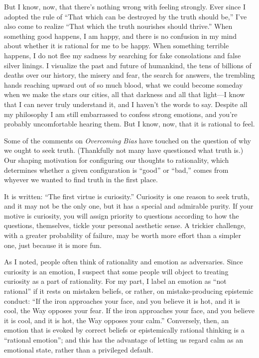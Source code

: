 {
 But I know, now, that there's nothing wrong with
feeling strongly. Ever since I adopted the rule of
``That which can be destroyed by the truth should
be,'' I've also come to realize
``That which the truth nourishes should
thrive.'' When something good happens, I am happy,
and there is no confusion in my mind about whether it is rational for
me to be happy. When something terrible happens, I do not flee my
sadness by searching for fake consolations and false silver linings. I
visualize the past and future of humankind, the tens of billions of
deaths over our history, the misery and fear, the search for answers,
the trembling hands reaching upward out of so much blood, what we could
become someday when we make the stars our cities, all that darkness and
all that light---I know that I can never truly understand it, and I
haven't the words to say. Despite all my philosophy I
am still embarrassed to confess strong emotions, and
you're probably uncomfortable hearing them. But I know,
now, that it is rational to feel.}

\myendsectiontext


{
 Some of the comments on \textit{Overcoming Bias} have touched on
the question of why we ought to seek truth. (Thankfully not many have
questioned what truth is.) Our shaping motivation for configuring our
thoughts to rationality, which determines whether a given configuration
is ``good'' or
``bad,'' comes from whyever we
wanted to find truth in the first place. }

{
 It is written: ``The first virtue is
curiosity.'' Curiosity is one reason to seek truth,
and it may not be the only one, but it has a special and admirable
purity. If your motive is curiosity, you will assign priority to
questions according to how the questions, themselves, tickle your
personal aesthetic sense. A trickier challenge, with a greater
probability of failure, may be worth more effort than a simpler one,
just because it is more fun.}

{
 As I noted, people often think of rationality and emotion as
adversaries. Since curiosity is an emotion, I suspect that some people
will object to treating curiosity as a part of rationality. For my
part, I label an emotion as ``not
rational'' if it rests on mistaken beliefs, or
rather, on mistake-producing epistemic conduct: ``If
the iron approaches your face, and you believe it is hot, and it is
cool, the Way opposes your fear. If the iron approaches your face, and
you believe it is cool, and it is hot, the Way opposes your
calm.'' Conversely, then, an emotion that is evoked
by correct beliefs or epistemically rational thinking is a
``rational emotion''; and this has
the advantage of letting us regard calm as an emotional state, rather
than a privileged default.}

